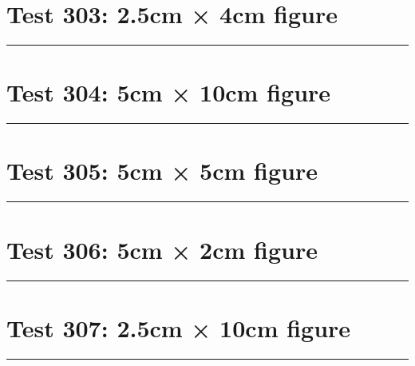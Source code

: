 \documentclass[a4paper,11pt]{article}
\begin{document}
\section*{Test 303: 2.5cm × 4cm figure}
\begin{swarmwrap}%
  \begin{minipage}[t]{2cm}
    \centering
    \rule{\linewidth}{4cm}
  \end{minipage}%
\end{swarmwrap}%
\swarmwrapnext
\lipsum[19]
\lipsum[20]
\lipsum[21]
\lipsum[22]
\section*{Test 304: 5cm × 10cm figure}
\begin{swarmwrap}%
  \begin{minipage}[t]{5cm}
    \centering
    \rule{\linewidth}{10cm}
  \end{minipage}%
\end{swarmwrap}%
\swarmwrapnext
\lipsum[57]
\lipsum[58]
\lipsum[59]
\lipsum[60]
\section*{Test 305: 5cm × 5cm figure}
\begin{swarmwrap}%
  \begin{minipage}[t]{5cm}
    \centering
    \rule{\linewidth}{5cm}
  \end{minipage}%
\end{swarmwrap}%
\swarmwrapnext
\lipsum[39]
\lipsum[40]
\lipsum[41]
\lipsum[42]
\lipsum[43]
\section*{Test 306: 5cm × 2cm figure}
\begin{swarmwrap}%
  \begin{minipage}[t]{5cm}
    \centering
    \rule{\linewidth}{2cm}
  \end{minipage}%
\end{swarmwrap}%
\swarmwrapnext
\lipsum[39]
\lipsum[40]
\lipsum[41]
\lipsum[42]
\lipsum[43]
\section*{Test 307: 2.5cm × 10cm figure}
\begin{swarmwrap}%
  \begin{minipage}[t]{2cm}
    \centering
    \rule{\linewidth}{10cm}
  \end{minipage}%
\end{swarmwrap}%
\swarmwrapnext
\lipsum[46]
\lipsum[47]
\lipsum[48]
\lipsum[49]
\lipsum[50]
\end{document}
